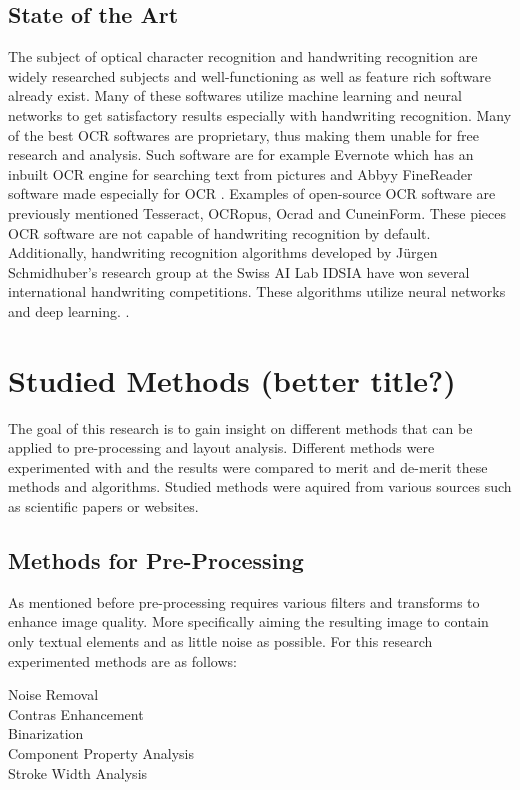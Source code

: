 \documentclass{article}
\begin{document}
    \subsection{State of the Art}
      The subject of optical character recognition and handwriting recognition are widely researched subjects and well-functioning as well as feature rich software already exist. Many of these softwares utilize machine learning and neural networks to get satisfactory results especially with handwriting recognition. Many of the best OCR softwares are proprietary, thus making them unable for free research and analysis. Such software are for example Evernote which has an inbuilt OCR engine for searching text from pictures \cite{Kelly} and Abbyy FineReader software made especially for OCR \cite{ABBYY}. Examples of open-source OCR software are previously mentioned Tesseract\cite{Smith2007a}, OCRopus\cite{Breuel2007}, Ocrad \cite{FreeSoftwareFoundation2016} and CuneinForm\cite{CognitiveTechnologies2016}. These pieces OCR software are not capable of handwriting recognition by default. Additionally, handwriting recognition algorithms developed by Jürgen Schmidhuber's research group at the Swiss AI Lab IDSIA have won several international handwriting competitions. These algorithms utilize neural networks and deep learning. \cite{Angelica}.


  \newpage
  \section{Studied Methods (better title?)}
    The goal of this research is to gain insight on different methods that can be applied to pre-processing and layout analysis. Different methods were experimented with and the results were compared to merit and de-merit these methods and algorithms. Studied methods were aquired from various sources such as scientific papers or websites.
    \subsection{Methods for Pre-Processing}
      As mentioned before pre-processing requires various filters and transforms to enhance image quality. More specifically aiming the resulting image to contain only textual elements and as little noise as possible. For this research experimented methods are as follows:
      \begin{description}
        \item [Noise Removal]
        \item [Contras Enhancement]
        \item [Binarization]
        \item [Component Property Analysis]
        \item [Stroke Width Analysis]
      \end{description}
\end{document}
